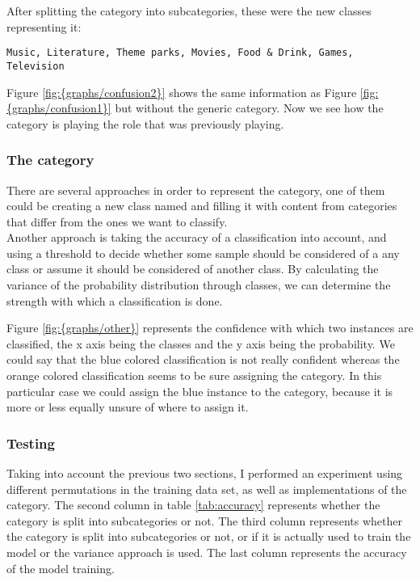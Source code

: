 After splitting the  category into subcategories, these were the new classes representing it: \\
\begin{lstlisting} 
Music, Literature, Theme parks, Movies, Food & Drink, Games, Television
\end{lstlisting} 
Figure \ref{fig:{graphs/confusion2}} shows the same information as 
Figure \ref{fig:{graphs/confusion1}} but without the generic  category. Now we see how the  category is playing the role that  was previously playing.


 

\subsubsection{The  category}
There are several approaches in order to represent the  category, one of them could be creating a new class named  and filling it with content from categories that 
differ from the ones we want to classify.\\
Another approach is taking the accuracy of a classification into account, and using a threshold to decide whether some sample should be considered of a any class or assume it should be considered of 
another class. 
By calculating the variance of the probability distribution through classes, we can determine the strength with which a classification is done.   


Figure \ref{fig:{graphs/other}} represents the confidence with which two instances are classified, the x axis being the classes
and the y axis being the probability. We could say that the blue colored classification is not really confident whereas the orange colored classification seems to be sure assigning the  
category. In this particular case we could assign the blue instance to the  category, because it is more or less equally unsure of where to assign it.


\subsubsection{Testing}
Taking into account the previous two sections, I performed an experiment using different permutations in the training data set, as well as implementations of the  category. 
The second column in table \ref{tab:accuracy} represents whether the  category is split into subcategories or not. The third column represents whether the  category
is split into subcategories or not, or if it is actually used to train the model or the variance approach is used. The last column represents the accuracy of the model training. \\
 

